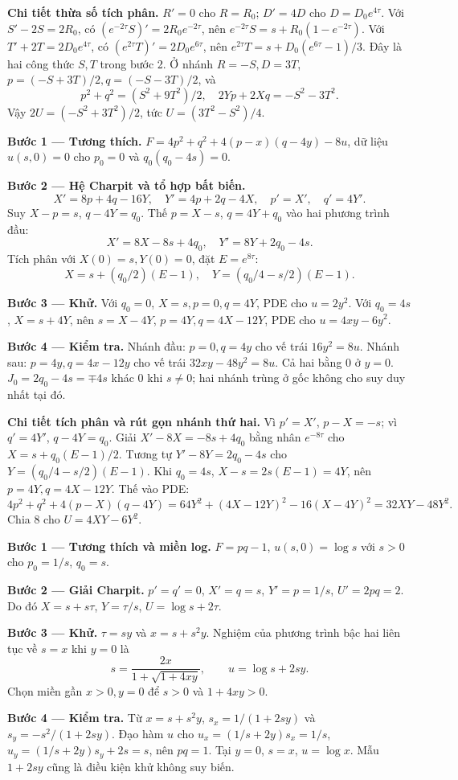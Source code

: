 \textbf{Chi tiết thừa số tích phân.} $R'=0$ cho $R=R_0$; $D'=4D$ cho $D=D_0e^{4\tau}$. Với $S'-2S=2R_0$, có $(e^{-2\tau}S)'=2R_0e^{-2\tau}$, nên $e^{-2\tau}S=s+R_0(1-e^{-2\tau})$. Với $T'+2T=2D_0e^{4\tau}$, có $(e^{2\tau}T)'=2D_0e^{6\tau}$, nên $e^{2\tau}T=s+D_0(e^{6\tau}-1)/3$. Đây là hai công thức $S,T$ trong bước 2. Ở nhánh $R=-S,D=3T$, $p=(-S+3T)/2,q=(-S-3T)/2$, và
\[p^2+q^2=(S^2+9T^2)/2,\quad 2Yp+2Xq=-S^2-3T^2.\]
Vậy $2U=(-S^2+3T^2)/2$, tức $U=(3T^2-S^2)/4$.

\textbf{Bước 1 — Tương thích.} $F=4p^2+q^2+4(p-x)(q-4y)-8u$, dữ liệu $u(s,0)=0$ cho $p_0=0$ và $q_0(q_0-4s)=0$.

\textbf{Bước 2 — Hệ Charpit và tổ hợp bất biến.}
\[X'=8p+4q-16Y,\quad Y'=4p+2q-4X,\quad p'=X',\quad q'=4Y'.\]
Suy $X-p=s$, $q-4Y=q_0$. Thế $p=X-s$, $q=4Y+q_0$ vào hai phương trình đầu:
\[X'=8X-8s+4q_0,\quad Y'=8Y+2q_0-4s.\]
Tích phân với $X(0)=s,Y(0)=0$, đặt $E=e^{8\tau}$:
\[X=s+(q_0/2)(E-1),\quad Y=(q_0/4-s/2)(E-1).\]

\textbf{Bước 3 — Khử.} Với $q_0=0$, $X=s,p=0,q=4Y$, PDE cho $u=2y^2$. Với $q_0=4s$, $X=s+4Y$, nên $s=X-4Y$, $p=4Y,q=4X-12Y$, PDE cho $u=4xy-6y^2$.

\textbf{Bước 4 — Kiểm tra.} Nhánh đầu: $p=0,q=4y$ cho vế trái $16y^2=8u$. Nhánh sau: $p=4y,q=4x-12y$ cho vế trái $32xy-48y^2=8u$. Cả hai bằng 0 ở $y=0$. $J_0=2q_0-4s=\mp4s$ khác 0 khi $s\ne0$; hai nhánh trùng ở gốc không cho suy duy nhất tại đó.

\textbf{Chi tiết tích phân và rút gọn nhánh thứ hai.} Vì $p'=X'$, $p-X=-s$; vì $q'=4Y'$, $q-4Y=q_0$. Giải $X'-8X=-8s+4q_0$ bằng nhân $e^{-8\tau}$ cho $X=s+q_0(E-1)/2$. Tương tự $Y'-8Y=2q_0-4s$ cho $Y=(q_0/4-s/2)(E-1)$. Khi $q_0=4s$, $X-s=2s(E-1)=4Y$, nên $p=4Y,q=4X-12Y$. Thế vào PDE:
\[4p^2+q^2+4(p-X)(q-4Y)
=64Y^2+(4X-12Y)^2-16(X-4Y)^2
=32XY-48Y^2.\]
Chia $8$ cho $U=4XY-6Y^2$.

\textbf{Bước 1 — Tương thích và miền log.} $F=pq-1$, $u(s,0)=\log s$ với $s>0$ cho $p_0=1/s$, $q_0=s$.

\textbf{Bước 2 — Giải Charpit.} $p'=q'=0$, $X'=q=s$, $Y'=p=1/s$, $U'=2pq=2$. Do đó $X=s+s\tau$, $Y=\tau/s$, $U=\log s+2\tau$.

\textbf{Bước 3 — Khử.} $\tau=sy$ và $x=s+s^2y$. Nghiệm của phương trình bậc hai liên tục về $s=x$ khi $y=0$ là
\[s=\frac{2x}{1+\sqrt{1+4xy}},\qquad u=\log s+2sy.\]
Chọn miền gần $x>0,y=0$ để $s>0$ và $1+4xy>0$.

\textbf{Bước 4 — Kiểm tra.} Từ $x=s+s^2y$, $s_x=1/(1+2sy)$ và $s_y=-s^2/(1+2sy)$. Đạo hàm $u$ cho $u_x=(1/s+2y)s_x=1/s$, $u_y=(1/s+2y)s_y+2s=s$, nên $pq=1$. Tại $y=0$, $s=x$, $u=\log x$. Mẫu $1+2sy$ cũng là điều kiện khử không suy biến.

